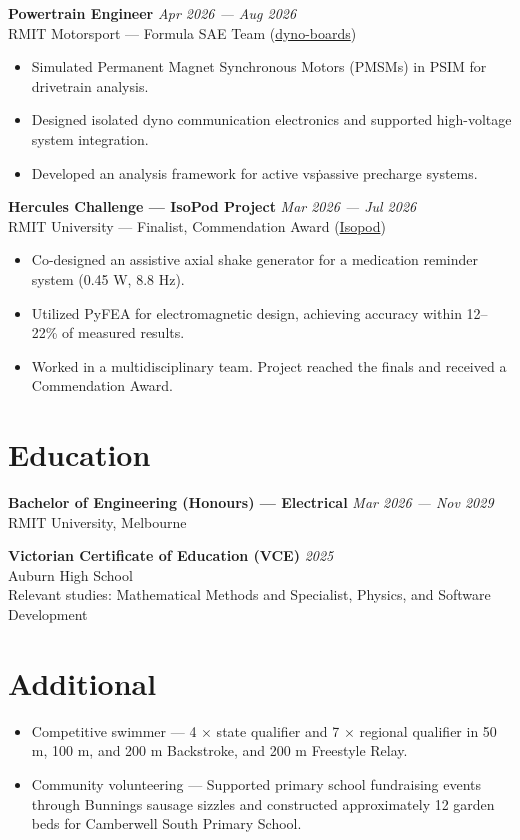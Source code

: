 \documentclass[11pt,a4paper]{article}
\begin{document}
\noindent\textbf{Powertrain Engineer} \hfill \textit{Apr 2026 --- Aug 2026} \\
RMIT Motorsport --- Formula SAE Team (\href{https://github.com/rmit-wgbowley/dyno-boards}{dyno-boards})
\begin{itemize}[leftmargin=*, noitemsep, topsep=2pt]
\item Simulated Permanent Magnet Synchronous Motors (PMSMs) in PSIM for drivetrain analysis.
\item Designed isolated dyno communication electronics and supported high-voltage system integration.
\item Developed an analysis framework for active vs\. passive precharge systems.
\end{itemize}


\noindent\textbf{Hercules Challenge --- IsoPod Project} \hfill \textit{Mar 2026 --- Jul 2026} \\
RMIT University --- Finalist, Commendation Award (\href{https://github.com/rmit-wgbowley/Isopod}{Isopod})
\begin{itemize}[leftmargin=*, noitemsep, topsep=2pt]
\item Co-designed an assistive axial shake generator for a medication reminder system (0.45 W, 8.8 Hz).
\item Utilized PyFEA for electromagnetic design, achieving accuracy within 12--22\% of measured results.
\item Worked in a multidisciplinary team. Project reached the finals and received a Commendation Award.
\end{itemize}

\section*{Education}

\noindent\textbf{Bachelor of Engineering (Honours) --- Electrical} \hfill \textit{Mar 2026 --- Nov 2029} \\
RMIT University, Melbourne

\noindent\textbf{Victorian Certificate of Education (VCE)} \hfill \textit{2025} \\
Auburn High School \\
Relevant studies: Mathematical Methods and Specialist, Physics, and Software Development

\section*{Additional}
\begin{itemize}[leftmargin=*, noitemsep, topsep=2pt]
\item Competitive swimmer --- 4 $\times$ state qualifier and 7 $\times$ regional qualifier in 50 m, 100 m, and 200 m Backstroke, and 200 m Freestyle Relay.
\item Community volunteering --- Supported primary school fundraising events through Bunnings sausage sizzles and constructed approximately 12 garden beds for Camberwell South Primary School.
\end{itemize}
\end{document}
